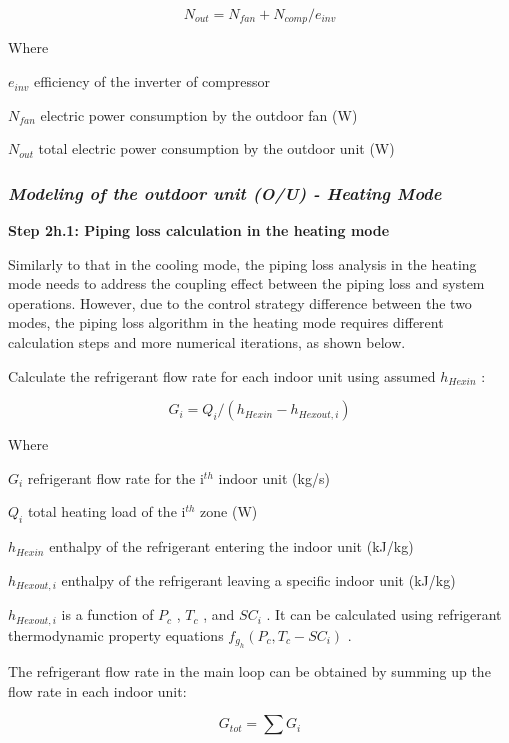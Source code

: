 \begin{equation}
N_{out} = N_{fan}+N_{comp}/e_{inv}
\end{equation}

Where

\(e_{inv}\) efficiency of the inverter of compressor

\(N_{fan}\) electric power consumption by the outdoor fan (W)

\(N_{out}\) total electric power consumption by the outdoor unit (W)

\subsubsection{\emph{Modeling of the outdoor unit (O/U) - Heating Mode}}\label{modeling-of-the-outdoor-unit-ou---heating-mode}

\textbf{Step 2h.1: Piping loss calculation in the heating mode} 

Similarly to that in the cooling mode, the piping loss analysis in the heating mode needs to address the coupling effect between the piping loss and system operations. However, due to the control strategy difference between the two modes, the piping loss algorithm in the heating mode requires different calculation steps and more numerical iterations, as shown below.

Calculate the refrigerant flow rate for each indoor unit using assumed \(h_{Hexin}\) :

\begin{equation}
G_i = Q_i/(h_{Hexin}-h_{Hexout,i})
\end{equation}

Where

\(G_i\) refrigerant flow rate for the i\(^{th}\) indoor unit (kg/s)

\(Q_i\) total heating load of the i\(^{th}\) zone (W)

\(h_{Hexin}\) enthalpy of the refrigerant entering the indoor unit (kJ/kg)

\(h_{Hexout,i}\) enthalpy of the refrigerant leaving a specific indoor unit (kJ/kg)

\(h_{Hexout,i}\) is a function of \(P_c\) , \(T_c\) , and \(SC_i\) . It can be calculated using refrigerant thermodynamic property equations \(f_{g_h}(P_c,T_c-SC_i)\) .

The refrigerant flow rate in the main loop can be obtained by summing up the flow rate in each indoor unit:

\begin{equation}
G_{tot} = \sum{G_i}
\end{equation}

